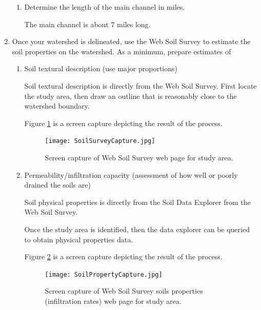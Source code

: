 \documentclass[12pt]{article}
\begin{document}
\begin{enumerate}
\begin{enumerate}
\item Determine the length of the main channel in miles.

The main channel is about 7 miles long.

\clearpage
\end{enumerate}

\item Once your watershed is delineated, use the Web Soil Survey to estimate the soil properties on the watershed.  
As a minimum, prepare estimates of
\begin{enumerate}
\item Soil textural description (use major proportions)

Soil textural description is directly from the Web Soil Survey.
First locate the study area, then draw an outline that is reasonably close to the watershed boundary.

Figure \ref{fig:SSC-1} is a screen capture depicting the result of the process.

\begin{figure}[h!] %
   \centering
   \texttt{[image: SoilSurveyCapture.jpg]} 
   \caption{Screen capture of Web Soil Survey web page for study area.}
   \label{fig:SSC-1}
\end{figure}
\clearpage
\item Permeability/infiltration capacity (assessment of how well or poorly drained the soils are)

Soil physical properties  is directly from the Soil Data Explorer from the Web Soil Survey.

Once the study area is identified, then the data explorer can be queried to obtain physical properties data.

Figure \ref{fig:SPC-1} is a screen capture depicting the result of the process.

\begin{figure}[h!] %
   \centering
   \texttt{[image: SoilPropertyCapture.jpg]} 
   \caption{Screen capture of Web Soil Survey soils properties (infiltration rates) web page for study area.}
   \label{fig:SPC-1}
\end{figure}


\end{enumerate} 
\end{enumerate}
\end{document}
